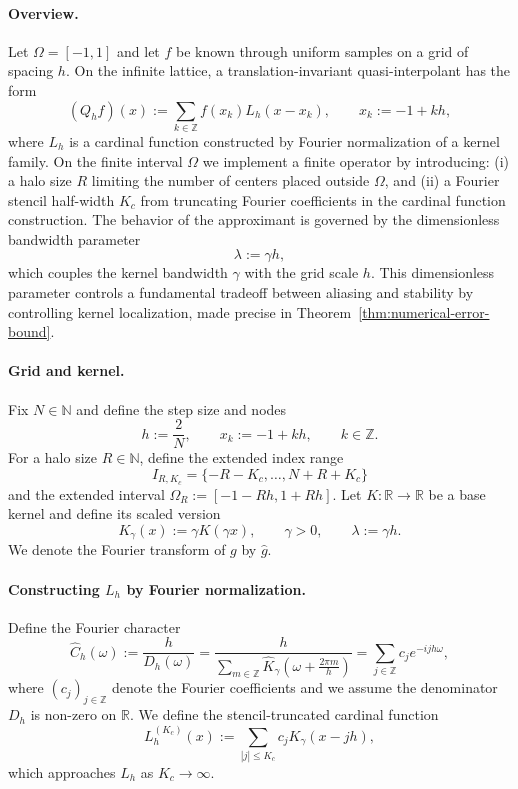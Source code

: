 \documentclass[11pt]{article}
\newcommand{\R}{\mathbb{R}}
\newcommand{\Z}{\mathbb{Z}}
\newcommand{\N}{\mathbb{N}}
\newcommand{\wh}[1]{\widehat{#1}}
\begin{document}
\paragraph{Overview.}
Let $\Omega=[-1,1]$ and let $f$ be known through uniform samples on a grid of spacing $h$. On the infinite lattice, a translation-invariant quasi-interpolant has the form
\begin{equation}
(Q_h f)(x) := \sum_{k\in\Z} f(x_k)L_h(x-x_k),
\qquad x_k := -1 + kh,
\label{eq:qh-infinite}
\end{equation}
where $L_h$ is a cardinal function constructed by Fourier normalization of a kernel family. On the finite interval $\Omega$ we implement a finite operator by introducing: (i) a halo size $R$ limiting the number of centers placed outside $\Omega$, and (ii) a Fourier stencil half-width $K_c$ from truncating Fourier coefficients in the cardinal function construction. The behavior of the approximant is governed by the dimensionless bandwidth parameter
\begin{equation}
\lambda := \gamma h,
\label{eq:lambda-def}
\end{equation}
which couples the kernel bandwidth $\gamma$ with the grid scale $h$. This dimensionless parameter controls a fundamental tradeoff between aliasing and stability by controlling kernel localization, made precise in Theorem~\ref{thm:numerical-error-bound}.

\paragraph{Grid and kernel.}
Fix $N\in\N$ and define the step size and nodes
\begin{equation}
h := \frac{2}{N},
\qquad x_k := -1+kh,
\qquad k\in\Z.
\label{eq:grid}
\end{equation}
For a halo size $R\in\N$, define the extended index range
\[
I_{R,K_c}=\{-R-K_c,\dots,N+R+K_c\}
\]
and the extended interval $\Omega_R := [-1-Rh,1+Rh]$. Let $K:\R\to\R$ be a base kernel and define its scaled version
\begin{equation}
K_\gamma(x):=\gamma K(\gamma x),
\qquad \gamma>0,
\qquad \lambda:=\gamma h.
\label{eq:scaled-kernel}
\end{equation}
We denote the Fourier transform of $g$ by $\wh g$.

\paragraph{Constructing $L_h$ by Fourier normalization.}
Define the Fourier character
\begin{equation}
\wh C_h(\omega) := \frac{h}{D_h(\omega)}
= \frac{h}{\sum_{m\in\Z}\wh K_\gamma\!\left(\omega+\frac{2\pi m}{h}\right)}
= \sum_{j\in\Z} c_j e^{-ijh\omega},
\label{eq:fourier-character}
\end{equation}
where $(c_j)_{j\in\Z}$ denote the Fourier coefficients and we assume the denominator $D_h$ is non-zero on $\R$. We define the stencil-truncated cardinal function
\begin{equation}
L_h^{(K_c)}(x):=\sum_{|j|\le K_c} c_j K_\gamma(x-jh),
\label{eq:truncated-cardinal}
\end{equation}
which approaches $L_h$ as $K_c\to\infty$.
\end{document}

